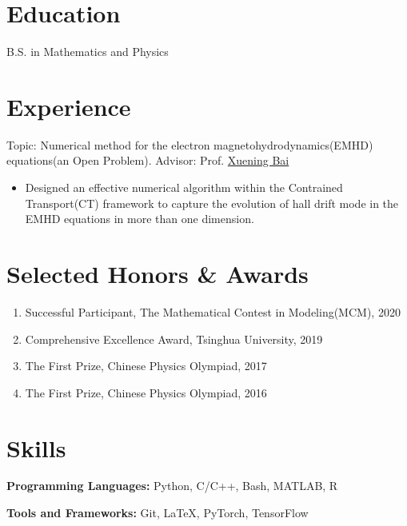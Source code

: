 \documentclass{resume}
\begin{document}



\section{Education}
B.S. in Mathematics and Physics

\section{Experience}
Topic: Numerical method for the electron magnetohydrodynamics(EMHD) equations(an Open Problem). Advisor: Prof. \href{http://astro.tsinghua.edu.cn/~xbai/}{Xuening Bai}
\begin{itemize}
    \item Designed an effective numerical algorithm within the Contrained Transport(CT) framework to capture the evolution of hall drift mode in the EMHD equations in more
    than one dimension.
\end{itemize}





\section{Selected Honors \& Awards}
\begin{enumerate}
    \item Successful Participant, The Mathematical Contest in Modeling(MCM), 2020
    \item Comprehensive Excellence Award, Tsinghua University, 2019
    \item The First Prize, Chinese Physics Olympiad, 2017
    \item The First Prize, Chinese Physics Olympiad, 2016
\end{enumerate}

\section{Skills}
\textbf{Programming Languages:} \small Python, C/C++, Bash, MATLAB, R

\textbf{Tools and Frameworks:} \small Git, \LaTeX, PyTorch, TensorFlow
\end{document}
